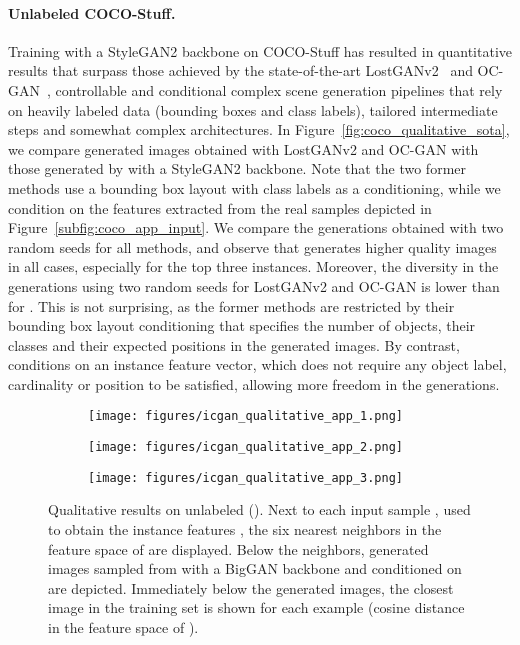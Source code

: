 \paragraph{Unlabeled COCO-Stuff.} Training \ours with a StyleGAN2 backbone on COCO-Stuff has resulted in quantitative results that surpass those achieved by the state-of-the-art LostGANv2~\cite{sun2020learning} and OC-GAN~\cite{sylvain2020object}, controllable and conditional complex scene generation pipelines that rely on heavily labeled data (bounding boxes and class labels), tailored intermediate steps and somewhat complex architectures. In Figure~\ref{fig:coco_qualitative_sota}, we compare generated images obtained with LostGANv2 and OC-GAN with those generated by \ours with a StyleGAN2 backbone. Note that the two former methods use a bounding box layout with class labels as a conditioning, while we condition on the features extracted from the real samples  depicted in Figure~\ref{subfig:coco_app_input}. We compare the generations obtained with two random seeds for all methods, and observe that \ours generates higher quality images in all cases, especially for the top three instances. Moreover, the diversity in the generations using two random seeds for LostGANv2 and OC-GAN is lower than for \ours. This is not surprising, as the former methods are restricted by their bounding box layout conditioning that specifies the number of objects, their classes and their expected positions in the generated images. By contrast, \ours conditions on an instance feature vector, which does not require any object label, cardinality or position to be satisfied, allowing more freedom in the generations. 


 \begin{figure}
\centering
\begin{subfigure}{1\textwidth}
 \centering
\texttt{[image: figures/icgan\_qualitative\_app\_1.png]}
\end{subfigure}
\begin{subfigure}{1\textwidth}
 \centering
\texttt{[image: figures/icgan\_qualitative\_app\_2.png]}
\end{subfigure}
\begin{subfigure}{1\textwidth}
 \centering
\texttt{[image: figures/icgan\_qualitative\_app\_3.png]}
\end{subfigure}
\caption{Qualitative results on unlabeled \ImNet (). Next to each input sample , used to obtain the instance features , the six nearest neighbors in the feature space of  are displayed. Below the neighbors, generated images sampled from \ours with a BigGAN backbone and conditioned on  are depicted. Immediately below the generated images, the closest image in the \ImNet training set is shown for each example (cosine distance in the feature space of ).
}
\label{fig:icgan_qualitative_app}
\end{figure}


